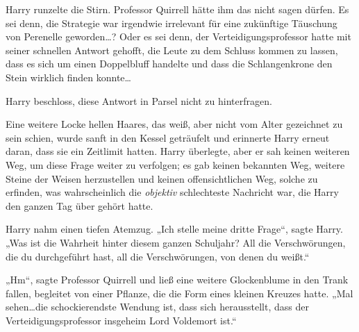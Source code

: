 Harry runzelte die Stirn.
Professor Quirrell hätte ihm das nicht sagen dürfen. Es sei denn, die Strategie war irgendwie irrelevant für eine zukünftige Täuschung von Perenelle geworden…? Oder es sei denn, der Verteidigungsprofessor hatte mit seiner schnellen Antwort gehofft, die Leute zu dem Schluss kommen zu lassen, dass es sich um einen Doppelbluff handelte und dass die Schlangenkrone den Stein wirklich finden konnte…

Harry beschloss, diese Antwort in Parsel nicht zu hinterfragen.

Eine weitere Locke hellen Haares, das weiß, aber nicht vom Alter gezeichnet zu sein schien, wurde sanft in den Kessel geträufelt und erinnerte Harry erneut daran, dass sie ein Zeitlimit hatten.
Harry überlegte, aber er sah keinen weiteren Weg, um diese Frage weiter zu verfolgen; es gab keinen bekannten Weg, weitere Steine der Weisen herzustellen und keinen offensichtlichen Weg, solche zu erfinden, was wahrscheinlich die \emph{objektiv} schlechteste Nachricht war, die Harry den ganzen Tag über gehört hatte.

Harry nahm einen tiefen Atemzug.
„Ich stelle meine dritte Frage“, sagte Harry. „Was ist die Wahrheit hinter diesem ganzen Schuljahr? All die Verschwörungen, die du durchgeführt hast, all die Verschwörungen, von denen du weißt.“

„Hm“, sagte Professor Quirrell und ließ eine weitere Glockenblume in den Trank fallen, begleitet von einer Pflanze, die die Form eines kleinen Kreuzes hatte.
„Mal sehen…die schockierendste Wendung ist, dass sich herausstellt, dass der Verteidigungsprofessor insgeheim Lord Voldemort ist.“

